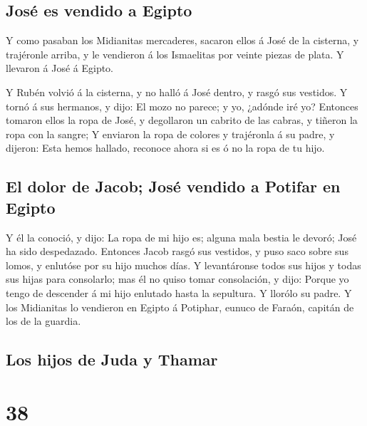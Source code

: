 \hypertarget{josuxe9-es-vendido-a-egipto}{%
\subsection{José es vendido a
Egipto}\label{josuxe9-es-vendido-a-egipto}}

 Y como pasaban los Midianitas mercaderes, sacaron ellos
á José de la cisterna, y trajéronle arriba, y le vendieron á los
Ismaelitas por veinte piezas de plata. Y llevaron á José á Egipto.

 Y Rubén volvió á la cisterna, y no halló á José dentro,
y rasgó sus vestidos.  Y tornó á sus hermanos, y dijo: El
mozo no parece; y yo, ¿adónde iré yo?  Entonces tomaron
ellos la ropa de José, y degollaron un cabrito de las cabras, y tiñeron
la ropa con la sangre;  Y enviaron la ropa de colores y
trajéronla á su padre, y dijeron: Esta hemos hallado, reconoce ahora si
es ó no la ropa de tu hijo.

\hypertarget{el-dolor-de-jacob-josuxe9-vendido-a-potifar-en-egipto}{%
\subsection{El dolor de Jacob; José vendido a Potifar en
Egipto}\label{el-dolor-de-jacob-josuxe9-vendido-a-potifar-en-egipto}}

 Y él la conoció, y dijo: La ropa de mi hijo es; alguna
mala bestia le devoró; José ha sido despedazado. 
Entonces Jacob rasgó sus vestidos, y puso saco sobre sus lomos, y
enlutóse por su hijo muchos días.  Y levantáronse todos
sus hijos y todas sus hijas para consolarlo; mas él no quiso tomar
consolación, y dijo: Porque yo tengo de descender á mi hijo enlutado
hasta la sepultura. Y llorólo su padre.  Y los Midianitas
lo vendieron en Egipto á Potiphar, eunuco de Faraón, capitán de los de
la guardia.

\hypertarget{los-hijos-de-juda-y-thamar}{%
\subsection{Los hijos de Juda y
Thamar}\label{los-hijos-de-juda-y-thamar}}

\hypertarget{section-37}{%
\section{38}\label{section-37}}

